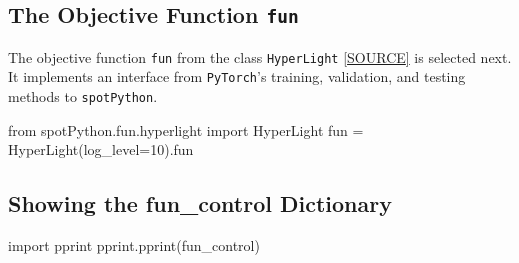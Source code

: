 \documentclass[
  letterpaper,
  DIV=11,
  numbers=noendperiod]{scrreprt}
\newenvironment{Shaded}{\begin{snugshade}}{\end{snugshade}}
\newcommand{\DecValTok}[1]{\textcolor[rgb]{0.68,0.00,0.00}{#1}}
\newcommand{\ImportTok}[1]{\textcolor[rgb]{0.00,0.46,0.62}{#1}}
\newcommand{\NormalTok}[1]{\textcolor[rgb]{0.00,0.23,0.31}{#1}}
\newcommand{\OperatorTok}[1]{\textcolor[rgb]{0.37,0.37,0.37}{#1}}
\begin{document}
\subsection{\texorpdfstring{The Objective Function
\texttt{fun}}{The Objective Function fun}}\label{sec-the-objective-function-32}

The objective function \texttt{fun} from the class \texttt{HyperLight}
\href{https://github.com/sequential-parameter-optimization/spotPython/blob/main/src/spotPython/fun/hyperlight.py}{{[}SOURCE{]}}
is selected next. It implements an interface from \texttt{PyTorch}'s
training, validation, and testing methods to \texttt{spotPython}.

\begin{Shaded}
\begin{Highlighting}[]
\ImportTok{from}\NormalTok{ spotPython.fun.hyperlight }\ImportTok{import}\NormalTok{ HyperLight}
\NormalTok{fun }\OperatorTok{=}\NormalTok{ HyperLight(log\_level}\OperatorTok{=}\DecValTok{10}\NormalTok{).fun}
\end{Highlighting}
\end{Shaded}

\subsection{Showing the fun\_control
Dictionary}\label{sec-show-fun-control-32}

\begin{Shaded}
\begin{Highlighting}[]
\ImportTok{import}\NormalTok{ pprint}
\NormalTok{pprint.pprint(fun\_control)}
\end{Highlighting}
\end{Shaded}
\end{document}
